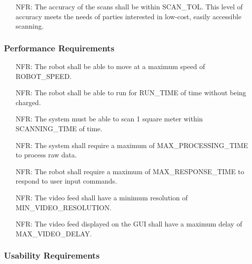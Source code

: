 \documentclass[12pt]{article}
\newcounter{nfrnum} %
\newcommand{\ScanningSpace}{1 square meter}
\begin{document}
\noindent \begin{itemize}
\item[NFR\refstepcounter{nfrnum}\thenfrnum\label{NFR_Accuracy1}:] The accuracy of the scans shall be within SCAN\_TOL. This level of accuracy meets the needs of parties interested in low-cost, easily accessible scanning.
\end{itemize}

\subsubsection{Performance Requirements}

\noindent \begin{itemize}
\item[NFR\refstepcounter{nfrnum}\thenfrnum\label{NFR_Performance1}:] The robot shall be able to move at a maximum speed of ROBOT\_SPEED.
\item[NFR\refstepcounter{nfrnum}\thenfrnum\label{NFR_Performance2}:] The robot shall be able to run for RUN\_TIME of time without being charged.
\item[NFR\refstepcounter{nfrnum}\thenfrnum\label{NFR_Performance3}:] The system must be able to scan \ScanningSpace{} within SCANNING\_TIME of time.
\item[NFR\refstepcounter{nfrnum}\thenfrnum\label{NFR_Performance4}:] The system shall require a maximum of MAX\_PROCESSING\_TIME to process raw data.
\item[NFR\refstepcounter{nfrnum}\thenfrnum\label{NFR_Performance5}:] The robot shall require a maximum of MAX\_RESPONSE\_TIME to respond to user input commands.
\item[NFR\refstepcounter{nfrnum}\thenfrnum\label{NFR_Performance6}:] The video feed shall have a minimum resolution of MIN\_VIDEO\_RESOLUTION.

\item[NFR\refstepcounter{nfrnum}\thenfrnum\label{NFR_Performance7}:] The video feed displayed on the GUI shall have a maximum delay of MAX\_VIDEO\_DELAY.
\end{itemize}

\subsubsection{Usability Requirements}
\end{document}
